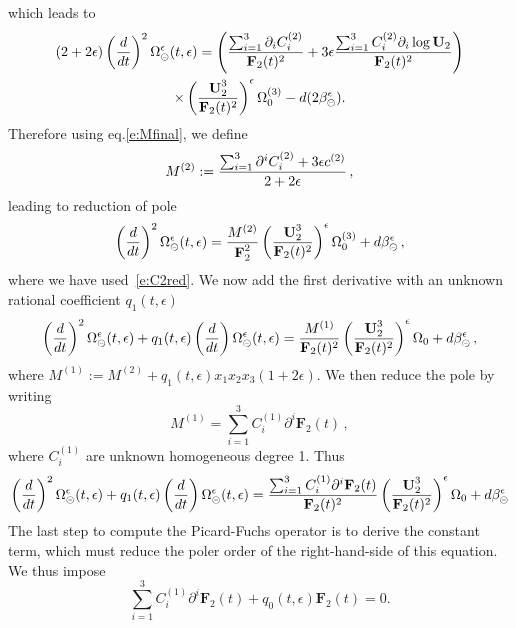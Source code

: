\documentclass[a4paper,12pt]{article}
\numberwithin{equation}{section}
\numberwithin{figure}{section}
\def\su{\circleddash}
\begin{document}
which leads to 
%
\begin{multline}
 (2+2\epsilon)\left(d\over dt\right)^2
  \Omega_{\su}^{\epsilon}(t,\epsilon)=
 \left({\sum_{i=1}^3 \partial_i C_i^{(2)}\over
     \textbf{F}_2(t)^{2}}+3\epsilon{\sum_{i=1}^3 C_i^{(2)}\partial_i
     \log \textbf{U}_2\over \textbf{F}_2(t)^{2}}\right)\cr \times\left(\textbf{U}_2^3\over \textbf{F}_2(t)^2\right)^\epsilon \Omega_0^{(3)}-d(2\beta_\su^\epsilon).
\end{multline}
%
Therefore using eq.\eqref{e:Mfinal}, we define
\begin{equation}
  \label{e:M2}
  M^{(2)}:={\sum_{i=1}^3 \partial^i  C_i^{(2)}+3\epsilon
    c^{(2)}\over 2+2\epsilon} \,, 
\end{equation}
leading to reduction of pole
\begin{equation}
 \left(d\over dt\right)^2
  \Omega_{\su}^{\epsilon}(t,\epsilon)=
{M^{(2)}\over
     \textbf{F}_2^{2}}\left(\textbf{U}_2^3\over \textbf{F}_2(t)^2\right)^\epsilon \Omega_0^{(3)}+d\beta_\su^\epsilon \, ,
 \end{equation}
where we have used~\eqref{e:C2red}.
%
We now add the first derivative with an unknown rational coefficient $q_1(t,\epsilon)$
\begin{multline}
 \left(d\over dt\right)^2
  \Omega_{\su}^{\epsilon}(t,\epsilon) +q_1(t,\epsilon) \left(d\over dt\right)
  \Omega_{\su}^{\epsilon}(t,\epsilon) =
{M^{(1)}\over
     \textbf{F}_2(t)^{2}}\left(\textbf{U}_2^3\over \textbf{F}_2(t)^2\right)^\epsilon \Omega_0+d\beta_\su^\epsilon \, , 
 \end{multline}
where $M^{(1)}:=M^{(2)}+q_1(t,\epsilon) x_1x_2x_3(1+2\epsilon)$.
 We then reduce the pole by writing
 \begin{equation}\label{e:M2red}
   M^{(1)}= \sum_{i=1}^3
   C_i^{(1)} \partial^i \textbf{F}_2(t) \,, 
 \end{equation}
 where $ C_i^{(1)}$ are unknown homogeneous degree 1.
Thus
\begin{equation}
 \left(d\over dt\right)^2
  \Omega_{\su}^{\epsilon}(t,\epsilon) +q_1(t,\epsilon) \left(d\over dt\right)
  \Omega_{\su}^{\epsilon}(t,\epsilon) =
{ \sum_{i=1}^3
   C_i^{(1)} \partial^i \textbf{F}_2(t)\over
     \textbf{F}_2(t)^{2}}\left(\textbf{U}_2^3\over \textbf{F}_2(t)^2\right)^\epsilon \Omega_0+d\beta_\su^\epsilon
 \end{equation}
%
The last step to compute the Picard-Fuchs operator is to derive the constant term, which must reduce the poler order of the right-hand-side of this equation. We thus impose
\begin{equation}\label{e:c0}
  \sum_{i=1}^3C_i^{(1)}\partial^i \textbf{F}_2(t)+ q_0(t,\epsilon) \textbf{F}_2 (t) =0.
\end{equation}
\end{document}
